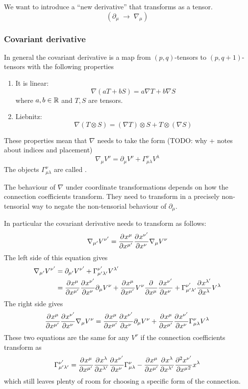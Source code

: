 We want to introduce a ``new derivative'' that transforms as a tensor.
\[ (\partial_\mu \; \to \; \nabla_\mu) \]
\subsubsection{Covariant derivative}
In general the covariant derivative is a map from $(p,q)$-tensors to $(p,q+1)$-tensors with the following properties
\begin{enumerate}
\item It is linear:
\[ \nabla(aT + bS) = a\nabla T + b\nabla S\]
where $a,b\in\R$ and $T,S$ are tensors.
\item Liebnitz:
\[ \nabla(T\otimes S) = (\nabla T) \otimes S + T \otimes (\nabla S) \]
\end{enumerate}

These properties mean that $\nabla$ needs to take the form (TODO: why + notes about indices and placement)
\[ \nabla_\mu V^\nu = \partial_\mu V^\nu + \Gamma^{\nu}_{\mu\lambda}V^\lambda \]
The objects $\Gamma^{\nu}_{\mu\lambda}$ are called .

The behaviour of $\nabla$ under coordinate transformations depends on how the connection coefficients transform. They need to transform in a precisely non-tensorial way to negate the non-tensorial behaviour of $\partial_\mu$.

In particular the covariant derivative needs to transform as follows:
\[ \nabla_{\mu'}V^{\nu'} = \pd{x^\mu}{x^{\mu'}}\pd{x^{\nu'}}{x^\nu}\nabla_\mu V^\nu \]
The left side of this equation gives
\begin{align}
\nabla_{\mu'}V^{\nu'} &= \partial_{\mu'}V^{\nu'} + \Gamma^{\nu'}_{\mu'\lambda'}V^{\lambda'} \\
&= \pd{x^\mu}{x^{\mu'}}\pd{x^{\nu'}}{x^\nu}\partial_\mu V^\nu + \pd{x^\mu}{x^{\mu'}}V^\nu \pd{}{x^\mu}\pd{x^{\nu'}}{x^\nu} + \Gamma^{\nu'}_{\mu'\lambda'} \pd{x^{\lambda'}}{x^\lambda}V^\lambda
\end{align}
The right side gives
\[ \pd{x^\mu}{x^{\mu'}}\pd{x^{\nu'}}{x^\nu}\nabla_\mu V^\nu = \pd{x^\mu}{x^{\mu'}}\pd{x^{\nu'}}{x^\nu}\partial_\mu V^\nu + \pd{x^\mu}{x^{\mu'}}\pd{x^{\nu'}}{x^\nu}\Gamma^\nu_{\mu\lambda} V^\lambda \]
These two equations are the same for any $V^\nu$ if the connection coefficients transform as
\[ \Gamma^{\nu'}_{\mu'\lambda'} = \pd{x^\mu}{x^{\mu'}}\pd{x^\lambda}{x^{\lambda'}}\pd{x^{\nu'}}{x^\nu}\Gamma^\nu_{\mu\lambda} - \pd{x^\mu}{x^{\mu'}}\pd{x^\lambda}{x^{\lambda'}}\pd[2]{x^{\nu'}}{x^\mu}{x^\lambda} \]
which still leaves plenty of room for choosing a specific form of the connection.

